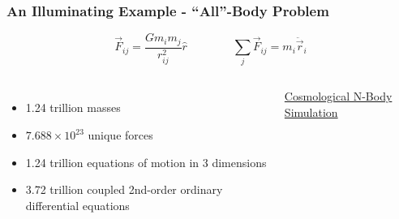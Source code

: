 \documentclass{beamer}
\begin{document}
\begin{frame}
    \frametitle{An Illuminating Example - ``All''-Body Problem}
    \vspace{-0.75in}
    \begin{equation*}
        \vec{F}_{ij} = \frac{G m_i m_j}{r_{ij}^2} \hat{r} \qquad \qquad \sum_j \vec{F}_{ij} = m_i \ddot{\vec{r}}_i 
    \end{equation*}

    \begin{columns}
        \begin{itemize}
            \item 1.24 trillion masses
            \item $7.688\times 10^{23}$ unique forces
            \item 1.24 trillion equations of motion in 3 dimensions
            \item 3.72 trillion coupled 2nd-order ordinary differential equations
        \end{itemize}

        \href{https://youtu.be/JAyrpJCC_dw?si=eY7EbSKib7siokgG}{Cosmological N-Body Simulation}\cite{Heitmann_2021}
    \end{columns}
\end{frame}

        
        
\end{document}
